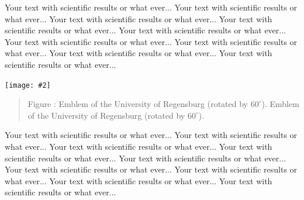 \documentclass[landscape,a0b,final]{a0poster}
\newenvironment{poster}{
  \begin{center}
  \begin{minipage}[c]{0.98\textwidth}
}{
  \end{minipage} 
  \end{center}
}
\newcommand{\myfig}[3][0]{
\begin{center}
  \vspace{1.5cm}
  \texttt{[image: \#2]}
  \nobreak\medskip
\end{center}}
\newcommand{\mycaption}[1]{
  \vspace{0.5cm}
  \begin{quote}
    {{\sc Figure} \arabic{figure}: #1}
  \end{quote}
  \vspace{1cm}
  \stepcounter{figure}
}
\begin{document}
\begin{poster}
\begin{multicols}{3}
Your text with scientific results or what ever... Your text with
scientific results or what ever... Your text with scientific results or
what ever... Your text with scientific results or what ever... Your
text with scientific results or what ever... Your text with scientific
results or what ever... Your text with scientific results or what
ever... Your text with scientific results or what ever... Your text
with scientific results or what ever...

\begin{center}
  \myfig[60]{gklogo.eps}{0.15}
  \mycaption{Emblem of the University of Regensburg (rotated by $60^\circ$). Emblem of the University of Regensburg (rotated by $60^\circ$).}
\end{center}

Your text with scientific results or what ever... Your text with
scientific results or what ever... Your text with scientific results or
what ever... Your text with scientific results or what ever... Your
text with scientific results or what ever... Your text with scientific
results or what ever... Your text with scientific results or what
ever... Your text with scientific results or what ever... Your text
with scientific results or what ever...






\end{multicols}

\end{poster}
\end{document}
